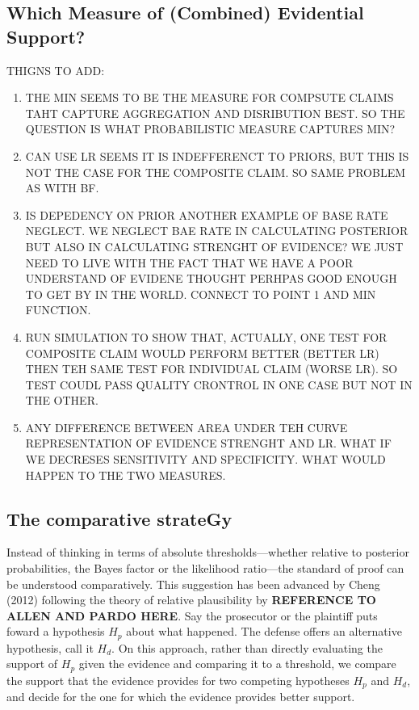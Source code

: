\documentclass[10pt,dvipsnames,enabledeprecatedfontcommands]{scrartcl}
\begin{document}
\hypertarget{which-measure-of-combined-evidential-support}{%
\subsection{Which Measure of (Combined) Evidential
Support?}\label{which-measure-of-combined-evidential-support}}

THIGNS TO ADD:

\begin{enumerate}
\def\labelenumi{\arabic{enumi}.}
\item
  THE MIN SEEMS TO BE THE MEASURE FOR COMPSUTE CLAIMS TAHT CAPTURE
  AGGREGATION AND DISRIBUTION BEST. SO THE QUESTION IS WHAT
  PROBABILISTIC MEASURE CAPTURES MIN?
\item
  CAN USE LR SEEMS IT IS INDEFFERENCT TO PRIORS, BUT THIS IS NOT THE
  CASE FOR THE COMPOSITE CLAIM. SO SAME PROBLEM AS WITH BF.
\item
  IS DEPEDENCY ON PRIOR ANOTHER EXAMPLE OF BASE RATE NEGLECT. WE NEGLECT
  BAE RATE IN CALCULATING POSTERIOR BUT ALSO IN CALCULATING STRENGHT OF
  EVIDENCE? WE JUST NEED TO LIVE WITH THE FACT THAT WE HAVE A POOR
  UNDERSTAND OF EVIDENE THOUGHT PERHPAS GOOD ENOUGH TO GET BY IN THE
  WORLD. CONNECT TO POINT 1 AND MIN FUNCTION.
\item
  RUN SIMULATION TO SHOW THAT, ACTUALLY, ONE TEST FOR COMPOSITE CLAIM
  WOULD PERFORM BETTER (BETTER LR) THEN TEH SAME TEST FOR INDIVIDUAL
  CLAIM (WORSE LR). SO TEST COUDL PASS QUALITY CRONTROL IN ONE CASE BUT
  NOT IN THE OTHER.
\item
  ANY DIFFERENCE BETWEEN AREA UNDER TEH CURVE REPRESENTATION OF EVIDENCE
  STRENGHT AND LR. WHAT IF WE DECRESES SENSITIVITY AND SPECIFICITY. WHAT
  WOULD HAPPEN TO THE TWO MEASURES.
\end{enumerate}

\hypertarget{the-comparative-strategy}{%
\subsection{The comparative strateGy}\label{the-comparative-strategy}}

Instead of thinking in terms of absolute thresholds---whether relative
to posterior probabilities, the Bayes factor or the likelihood
ratio---the standard of proof can be understood comparatively. This
suggestion has been advanced by Cheng (2012) following the theory of
relative plausibility by \textbf{REFERENCE TO ALLEN AND PARDO HERE}. Say
the prosecutor or the plaintiff puts foward a hypothesis \(H_p\) about
what happened. The defense offers an alternative hypothesis, call it
\(H_d\). On this approach, rather than directly evaluating the support
of \(H_p\) given the evidence and comparing it to a threshold, we
compare the support that the evidence provides for two competing
hypotheses \(H_p\) and \(H_d\), and decide for the one for which the
evidence provides better support.
\end{document}

